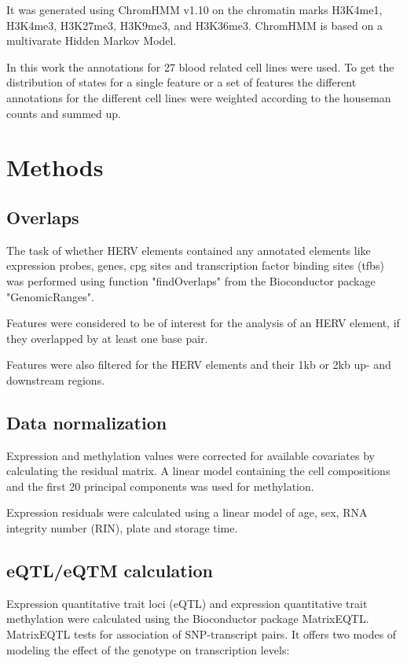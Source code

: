 \documentclass[a4paper,12pt]{article}
\begin{document}
It was generated using ChromHMM v1.10\cite{10.1038/nmeth.1906} on the chromatin marks H3K4me1, H3K4me3, H3K27me3, H3K9me3, and H3K36me3. ChromHMM is based on a multivarate Hidden Markov Model. 

In this work the annotations for 27 blood related cell lines were used. To get the distribution of states for a single feature or a set of features the different annotations for the different cell lines were weighted according to the houseman counts and summed up.

\newpage
\section{Methods}
\subsection{Overlaps}
The task of whether HERV elements contained any annotated elements like expression probes, genes, cpg sites and transcription factor binding sites (tfbs) was performed using function "findOverlaps" from the Bioconductor package "GenomicRanges"\cite{10.1371/journal.pcbi.1003118}. 

Features were considered to be of interest for the analysis of an HERV element, if they overlapped by at least one base pair.

Features were also filtered for the HERV elements and their 1kb or 2kb up- and downstream regions.

\subsection{Data normalization}
Expression and methylation values were corrected for available covariates by calculating the residual matrix. 
A linear model containing the cell compositions and the first 20 principal components was used for methylation.

Expression residuals were calculated using a linear model of age, sex, RNA integrity number (RIN), plate and storage time. 

\subsection{eQTL/eQTM calculation}
Expression quantitative trait loci (eQTL) and expression quantitative trait methylation were calculated using the Bioconductor package MatrixEQTL\cite{10.1093/bioinformatics/bts163}. MatrixEQTL tests for association of SNP-transcript pairs. It offers two modes of modeling the effect of the genotype on transcription levels: 
\end{document}
